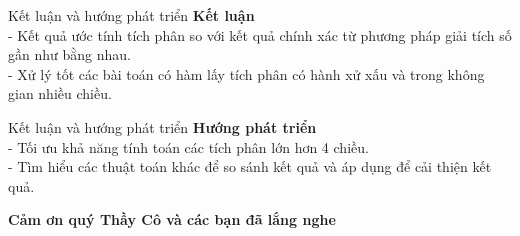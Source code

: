 \documentclass{beamer}
\begin{document}
\begin{frame}{Kết luận và hướng phát triển}\vspace{4pt}
  \textbf{Kết luận}\\
  \vspace{0.4em}
  - Kết quả ước tính tích phân so với kết quả chính xác từ phương pháp giải tích số gần như bằng nhau. \\
  - Xử lý tốt các bài toán có hàm lấy tích phân có hành xử xấu và trong không gian nhiều chiều.\\
\end{frame}
\begin{frame}{Kết luận và hướng phát triển}\vspace{4pt}
  \textbf{Hướng phát triển}\\
  \vspace{0.4em}
  - Tối ưu khả năng tính toán các tích phân lớn hơn 4 chiều.\\
  - Tìm hiểu các thuật toán khác để so sánh kết quả và áp dụng để cải thiện kết quả.\\
\end{frame}

\begin{frame}{}\vspace{4pt}
  \fontsize{16pt}{40pt}
  \textbf{      Cảm ơn quý Thầy Cô và các bạn đã lắng nghe}\\
\end{frame}
\end{document}
